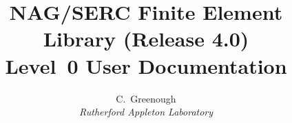 \title{\Huge \bf NAG/SERC Finite Element Library (Release 4.0)\\[10mm]
Level~0 User Documentation}
\author{\Large C.~Greenough\\
               \it Rutherford Appleton Laboratory}

%
\maketitle


